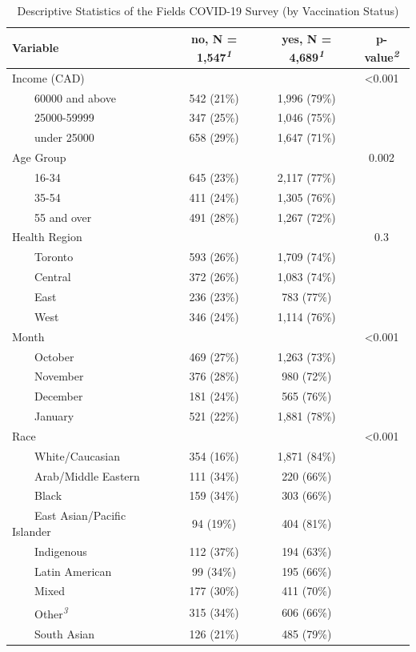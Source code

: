 \documentclass[
  letterpaper,
  DIV=11,
  numbers=noendperiod]{scrartcl}
\begin{document}
\hypertarget{tbl-descriptive-stats}{}
\setlength{\LTpost}{0mm}
\begin{longtable}{lccc}
\caption{\label{tbl-descriptive-stats}Descriptive Statistics of the Fields COVID-19 Survey (by Vaccination
Status) }\tabularnewline

\toprule
\textbf{Variable} & \textbf{no}, N = 1,547\textsuperscript{\textit{1}} & \textbf{yes}, N = 4,689\textsuperscript{\textit{1}} & \textbf{p-value}\textsuperscript{\textit{2}} \\ 
\midrule
Income (CAD) &  &  & <0.001 \\ 
    60000 and above & 542 (21\%) & 1,996 (79\%) &  \\ 
    25000-59999 & 347 (25\%) & 1,046 (75\%) &  \\ 
    under 25000 & 658 (29\%) & 1,647 (71\%) &  \\ 
Age Group &  &  & 0.002 \\ 
    16-34 & 645 (23\%) & 2,117 (77\%) &  \\ 
    35-54 & 411 (24\%) & 1,305 (76\%) &  \\ 
    55 and over & 491 (28\%) & 1,267 (72\%) &  \\ 
Health Region &  &  & 0.3 \\ 
    Toronto & 593 (26\%) & 1,709 (74\%) &  \\ 
    Central & 372 (26\%) & 1,083 (74\%) &  \\ 
    East & 236 (23\%) & 783 (77\%) &  \\ 
    West & 346 (24\%) & 1,114 (76\%) &  \\ 
Month &  &  & <0.001 \\ 
    October & 469 (27\%) & 1,263 (73\%) &  \\ 
    November & 376 (28\%) & 980 (72\%) &  \\ 
    December & 181 (24\%) & 565 (76\%) &  \\ 
    January & 521 (22\%) & 1,881 (78\%) &  \\ 
Race &  &  & <0.001 \\ 
    White/Caucasian & 354 (16\%) & 1,871 (84\%) &  \\ 
    Arab/Middle Eastern & 111 (34\%) & 220 (66\%) &  \\ 
    Black & 159 (34\%) & 303 (66\%) &  \\ 
    East Asian/Pacific Islander & 94 (19\%) & 404 (81\%) &  \\ 
    Indigenous & 112 (37\%) & 194 (63\%) &  \\ 
    Latin American & 99 (34\%) & 195 (66\%) &  \\ 
    Mixed & 177 (30\%) & 411 (70\%) &  \\ 
    Other\textsuperscript{\textit{3}} & 315 (34\%) & 606 (66\%) &  \\ 
    South Asian & 126 (21\%) & 485 (79\%) &  \\ 
\bottomrule
\end{longtable}
\end{document}
